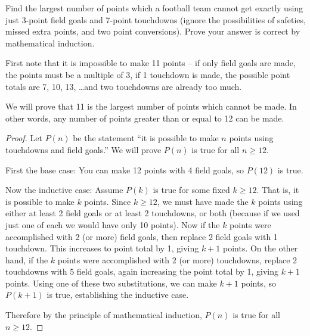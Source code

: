 \question[8] Find the largest number of points which a football team cannot get exactly using just 3-point field goals and 7-point touchdowns (ignore the possibilities of safeties, missed extra points, and two point conversions).  Prove your answer is correct by mathematical induction.

\begin{solution}
  First note that it is impossible to make 11 points -- if only field goals are made, the points must be a multiple of 3, if 1 touchdown is made, the possible point totals are 7, 10, 13, \ldots and two touchdowns are already too much.

  We will prove that 11 is the largest number of points which cannot be made.  In other words, any number of points greater than or equal to 12 can be made.

  \begin{proof}
    Let $P(n)$ be the statement ``it is possible to make $n$ points using touchdowns and field goals.''  We will prove $P(n)$ is true for all $n \ge 12$.

    First the base case: You can make 12 points with 4 field goals, so $P(12)$ is true.

    Now the inductive case: Assume $P(k)$ is true for some fixed $k \ge 12$.  That is, it is possible to make $k$ points.  Since $k \ge 12$, we must have made the $k$ points using either at least 2 field goals or at least 2 touchdowns, or both (because if we used just one of each we would have only 10 points).  Now if the $k$ points were accomplished with 2 (or more) field goals, then replace 2 field goals with 1 touchdown.  This increases to point total by 1, giving $k + 1$ points.  On the other hand, if the $k$ points were accomplished with $2$ (or more) touchdowns, replace 2 touchdowns with 5 field goals, again increasing the point total by 1, giving $k+1$ points.  Using one of these two substitutions, we can make $k+1$ points, so $P(k+1)$ is true, establishing the inductive case.

    Therefore by the principle of mathematical induction, $P(n)$ is true for all $n \ge 12$.
  \end{proof}
\end{solution}


